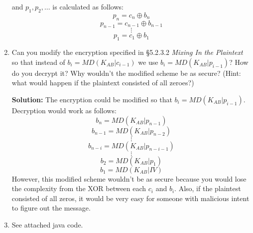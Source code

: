 \documentclass[11pt]{article}
\begin{document}
\begin{enumerate}
and $p_1, p_2, \hdots$ is calculated as follows:
$$ p_n = c_n \oplus b_n $$
$$ p_{n-1} = c_{n-1} \oplus b_{n-1} $$
$$ \vdots $$
$$ p_1 = c_1 \oplus b_1 $$

\item Can you modify the encryption specified in §5.2.3.2 \textit{Mixing In the Plaintext} so that instead of $b_i = MD(K_{AB}|c_{i-1})$ we use $b_i = MD(K_{AB}|p_{i-1})$? How do you decrypt it? Why wouldn't the modified scheme be as secure? (Hint: what would happen if the plaintext consisted of all zeroes?)

\textbf{Solution: }
The encryption could be modified so that $b_i = MD(K_{AB}|p_{i-1})$.  Decryption would work as follows:
$$ b_n = MD(K_{AB} | p_{n-1}) $$
$$ b_{n-1} = MD(K_{AB} | p_{n-2}) $$
$$ \vdots $$
$$ b_{n-i} = MD(K_{AB} | p_{n-i-1}) $$
$$ \vdots $$
$$ b_2 = MD(K_{AB} | p_1) $$
$$ b_1 = MD(K_{AB} | IV) $$
However, this modified scheme wouldn't be as secure because you would lose the complexity from the XOR between each $c_i$ and $b_i$.  Also, if the plaintest consisted of all zeros, it would be very easy for someone with malicious intent to figure out the message.  

\item See attached java code.  
\end{enumerate}
\end{document}
